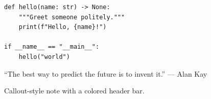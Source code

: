 \documentclass[border=10pt]{standalone}
\begin{document}
\begin{minipage}{0.8\textwidth}
\begin{lstlisting}[style=py, caption={Hello example}]
def hello(name: str) -> None:
    """Greet someone politely."""
    print(f"Hello, {name}!")

if __name__ == "__main__":
    hello("world")
\end{lstlisting}

\vspace{1em}

\begin{mdframed}[
  linecolor=blue!50, linewidth=0.5pt,
  backgroundcolor=blue!5,
  roundcorner=4pt,
  innerleftmargin=10pt, innerrightmargin=10pt,
  innertopmargin=8pt, innerbottommargin=8pt,
]
``The best way to predict the future is to invent it.''
\hfill --- Alan Kay
\end{mdframed}

\vspace{1em}

\begin{tcolorbox}[
  colback=orange!5, colframe=orange!60!black,
  title=Important, fonttitle=\bfseries,
]
Callout-style note with a colored header bar.
\end{tcolorbox}
\end{minipage}
\end{document}
